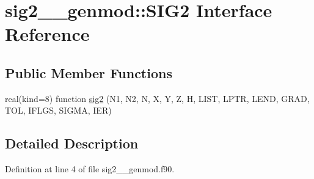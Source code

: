 \hypertarget{interfacesig2____genmod_1_1SIG2}{\section{sig2\+\_\+\+\_\+genmod\+:\+:S\+I\+G2 Interface Reference}
\label{interfacesig2____genmod_1_1SIG2}
}
\subsection*{Public Member Functions}
\begin{DoxyCompactItemize}
\item 
real(kind=8) function \hyperlink{interfacesig2____genmod_1_1SIG2_a8ae044698fa049548b7b638d9c7ccb33}{sig2} (N1, N2, N, X, Y, Z, H, L\+I\+S\+T, L\+P\+T\+R, L\+E\+N\+D, G\+R\+A\+D, T\+O\+L, I\+F\+L\+G\+S, S\+I\+G\+M\+A, I\+E\+R)
\end{DoxyCompactItemize}


\subsection{Detailed Description}


Definition at line 4 of file sig2\+\_\+\+\_\+genmod.\+f90.



